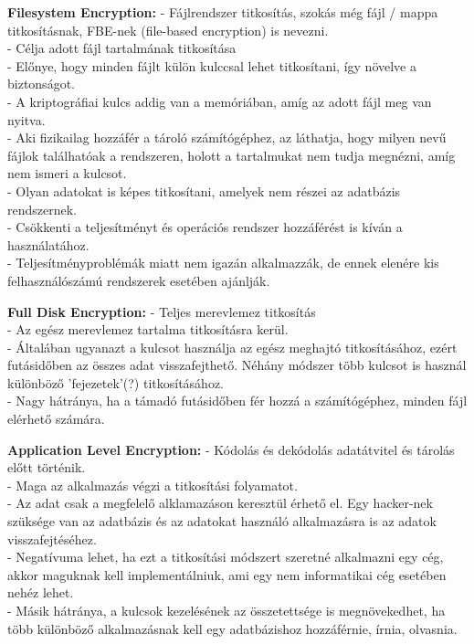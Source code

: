 \vspace{25pt}
\noindent\textbf{Filesystem Encryption:} \newline
\noindent- Fájlrendszer titkosítás, szokás még fájl / mappa titkosításnak, FBE-nek (file-based encryption) is nevezni.
\\- Célja adott fájl tartalmának titkosítása
\\- Előnye, hogy minden fájlt külön kulccsal lehet titkosítani, így növelve a biztonságot.
\\- A kriptográfiai kulcs addig van a memóriában, amíg az adott fájl meg van nyitva.
\\- Aki fizikailag hozzáfér a tároló számítógéphez, az láthatja, hogy milyen nevű fájlok találhatóak a rendszeren, holott a tartalmukat nem tudja megnézni, amíg nem ismeri a kulcsot.
\\- Olyan adatokat is képes titkosítani, amelyek nem részei az adatbázis rendszernek.
\\- Csökkenti a teljesítményt és operációs rendszer hozzáférést is kíván a használatához.
\\- Teljesítményproblémák miatt nem igazán alkalmazzák, de ennek elenére kis felhasználószámú rendszerek esetében ajánlják.


\vspace{25pt}
\noindent\textbf{Full Disk Encryption:} \newline
\noindent- Teljes merevlemez titkosítás
\\- Az egész merevlemez tartalma titkosításra kerül. 
\\- Általában ugyanazt a kulcsot használja az egész meghajtó titkosításához, ezért futásidőben az összes adat visszafejthető. Néhány módszer több kulcsot is használ különböző ’fejezetek’(?) titkosításához.
\\- Nagy hátránya, ha a támadó futásidőben fér hozzá a számítógéphez, minden fájl elérhető számára. 

\vspace{25pt}
\noindent\textbf{Application Level Encryption:} \newline
\noindent- Kódolás és dekódolás adatátvitel és tárolás előtt történik.
\\- Maga az alkalmazás végzi a titkosítási folyamatot.
\\- Az adat csak a megfelelő alklamazáson keresztül érhető el. Egy hacker-nek szüksége van az adatbázis és az adatokat használó alkalmazásra is az adatok visszafejtéséhez.
\\- Negatívuma lehet, ha ezt a titkosítási módszert szeretné alkalmazni egy cég, akkor maguknak kell implementálniuk, ami egy nem informatikai cég esetében nehéz lehet.
\\- Másik hátránya, a kulcsok kezelésének az összetettsége is megnövekedhet, ha több különböző alkalmazásnak kell egy adatbázishoz hozzáférnie, írnia, olvasnia.


